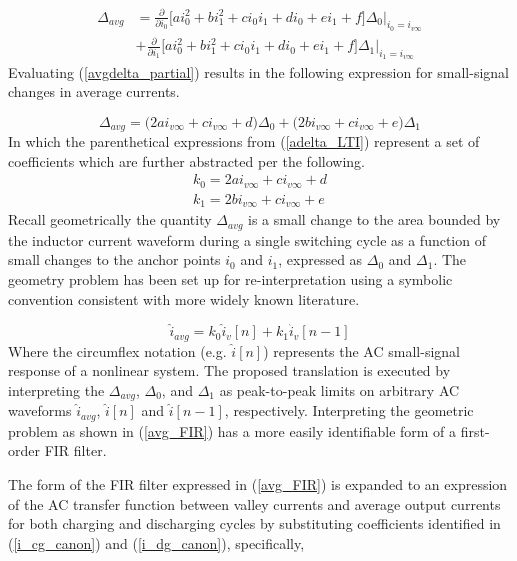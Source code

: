 \documentclass[conference]{IEEEtran}
\begin{document}
\begin{align}
	\Delta_{avg} &= 
	\frac{\partial}{\partial i_0} 
	\bigg [
	a i_0^2+b i_1^2+c i_0i_1+d i_0+e i_1+f \bigg ] 
	\Delta_0 \bigg |_{i_0=i_{v\infty}} \nonumber \\
	&+ 
	\frac{\partial}{\partial i_1} 
	\bigg [
	a i_0^2+b i_1^2+c i_0i_1+d i_0+e i_1+f \bigg ] 
	\Delta_1 \bigg |_{i_1=i_{v\infty}}
	\label{avgdelta_partial}
\end{align}
Evaluating (\ref{avgdelta_partial}) results in the following expression for small-signal changes in average currents.

\begin{equation}
	\Delta_{avg} = \big ( 2 a i_{v\infty} + c i_{v\infty} + d  \big) \Delta_0 + 
	\big ( 2 b i_{v\infty} + c i_{v\infty} + e  \big) \Delta_1
	\label{adelta_LTI}
\end{equation}
In which the parenthetical expressions from (\ref{adelta_LTI}) represent a set of coefficients which are further abstracted per the following.
\begin{align}
k_0 = 2 a i_{v\infty} + c i_{v\infty} + d \nonumber \\
k_1 = 2 b i_{v\infty} + c i_{v\infty} + e 
\end{align}
Recall geometrically the quantity $\Delta_{avg}$ is a small change to the area bounded by the inductor current waveform during a single switching cycle as a function of small changes to the anchor points $i_0$ and $i_1$, expressed as $\Delta_0$ and $\Delta_1$. The geometry problem has been set up for re-interpretation using a symbolic convention consistent with more widely known literature.

\begin{equation}
		\hat{i}_{avg} = k_0 \hat{i}_v[n] + 
	k_1 \hat{i}_v[n-1]
	\label{avg_FIR}
\end{equation}
Where the circumflex notation (e.g. $\hat{i}[n]$) represents the AC small-signal response of a nonlinear system. The proposed translation is executed by interpreting the $\Delta_{avg}$, $\Delta_0$, and $\Delta_1$ as peak-to-peak limits on arbitrary AC waveforms $\hat{i}_{avg}$, $\hat{i}[n]$ and $\hat{i}[n-1]$, respectively. Interpreting the geometric problem as shown in (\ref{avg_FIR}) has a more easily identifiable form of a first-order FIR filter.

The form of the FIR filter expressed in (\ref{avg_FIR}) is expanded to an expression of the AC transfer function between valley currents and average output currents for both charging and discharging cycles by substituting coefficients identified in (\ref{i_cg_canon}) and (\ref{i_dg_canon}), specifically,
\end{document}
